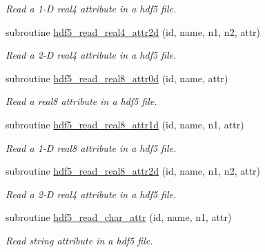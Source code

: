 \begin{DoxyCompactItemize}
\begin{DoxyCompactList}\small\item\em Read a 1-\/D real4 attribute in a hdf5 file. \end{DoxyCompactList}\item 
subroutine \hyperlink{namespacemodhdf5_a783cb12e2d85f812c506fff7cc69f37a}{hdf5\+\_\+read\+\_\+real4\+\_\+attr2d} (id, name, n1, n2, attr)
\begin{DoxyCompactList}\small\item\em Read a 2-\/D real4 attribute in a hdf5 file. \end{DoxyCompactList}\item 
subroutine \hyperlink{namespacemodhdf5_ad2a6c1b4f0229be1ac9f4e4eb0556af4}{hdf5\+\_\+read\+\_\+real8\+\_\+attr0d} (id, name, attr)
\begin{DoxyCompactList}\small\item\em Read a real8 attribute in a hdf5 file. \end{DoxyCompactList}\item 
subroutine \hyperlink{namespacemodhdf5_a5010be0e91c8d56afbd40530b8064d6a}{hdf5\+\_\+read\+\_\+real8\+\_\+attr1d} (id, name, n1, attr)
\begin{DoxyCompactList}\small\item\em Read a 1-\/D real8 attribute in a hdf5 file. \end{DoxyCompactList}\item 
subroutine \hyperlink{namespacemodhdf5_a85144bc1c41d08550379f855b3974507}{hdf5\+\_\+read\+\_\+real8\+\_\+attr2d} (id, name, n1, n2, attr)
\begin{DoxyCompactList}\small\item\em Read a 2-\/D real4 attribute in a hdf5 file. \end{DoxyCompactList}\item 
subroutine \hyperlink{namespacemodhdf5_a2da336bc6d0ebbf1e6d582469b741a63}{hdf5\+\_\+read\+\_\+char\+\_\+attr} (id, name, n1, attr)
\begin{DoxyCompactList}\small\item\em Read string attribute in a hdf5 file. \end{DoxyCompactList}\end{DoxyCompactItemize}

